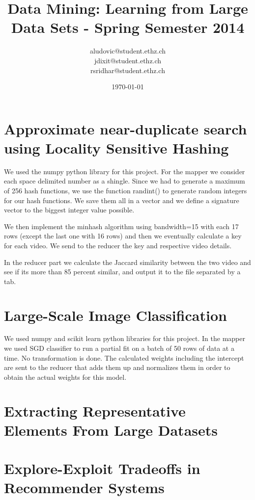 \documentclass[a4paper, 11pt]{article}
\title{Data Mining: Learning from Large Data Sets - Spring Semester 2014}
\author{aludovic@student.ethz.ch\\ jdixit@student.ethz.ch\\ rsridhar@student.ethz.ch\\}
\date{\today}
\begin{document}
\maketitle

\section{Approximate near-duplicate search using Locality Sensitive Hashing} 

We used the numpy python library for this project. For the mapper we consider each space delimited number as a shingle. Since we had to generate a maximum of 256 hash functions, we use the function randint() to generate random integers for our hash functions. We save them all in a vector and we define a signature vector to the biggest integer value possible.

We then implement the minhash algorithm using bandwidth=15 with each 17 rows (except the last one with 16 rows) and then we eventually calculate a key for each video. We send to the reducer the key and respective video details.

In the reducer part we calculate the Jaccard similarity between the two video and see if its more than 85 percent similar, and output it to the file separated by a tab.



\section{Large-Scale Image Classification}

We used numpy and scikit learn python libraries for this project. In the mapper we used SGD classifier to run a partial fit on a batch of 50 rows of data at a time. No transformation is done. The calculated weights including the intercept are sent to the reducer that adds them up and normalizes them in order to obtain the actual weights for this model.

\section{Extracting Representative Elements From Large Datasets}


\section{Explore-Exploit Tradeoffs in Recommender Systems}
\end{document}
